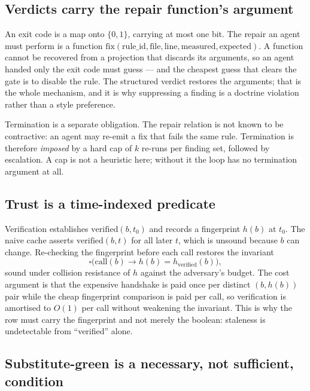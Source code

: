 \documentclass[11pt]{article}
\providecommand{\Box}{\square}
\begin{document}
\subsection{Verdicts carry the repair function's argument}
\label{lbl:HS-GATE-06}

An exit code is a map onto $\{0,1\}$, carrying at most one bit. The repair an
agent must perform is a function $\mathrm{fix}(\mathrm{rule\_id},
\mathrm{file}, \mathrm{line}, \mathrm{measured}, \mathrm{expected})$. A function
cannot be recovered from a projection that discards its arguments, so an agent
handed only the exit code must guess --- and the cheapest guess that clears the
gate is to disable the rule. The structured verdict restores the arguments;
that is the whole mechanism, and it is why suppressing a finding is a doctrine
violation rather than a style preference.

Termination is a separate obligation. The repair relation is not known to be
contractive: an agent may re-emit a fix that fails the same rule. Termination
is therefore \emph{imposed} by a hard cap of $k$ re-runs per finding set,
followed by escalation. A cap is not a heuristic here; without it the loop has
no termination argument at all.

\subsection{Trust is a time-indexed predicate}
\label{lbl:HS-GATE-07}

Verification establishes $\mathrm{verified}(b, t_0)$ and records a fingerprint
$h(b)$ at $t_0$. The naive cache asserts $\mathrm{verified}(b, t)$ for all
later $t$, which is unsound because $b$ can change. Re-checking the fingerprint
before each call restores the invariant
\begin{equation}
\Box\big(\mathrm{call}(b) \rightarrow h(b) = h_{\mathrm{verified}}(b)\big),
\end{equation}
sound under collision resistance of $h$ against the adversary's budget. The
cost argument is that the expensive handshake is paid once per distinct
$(b, h(b))$ pair while the cheap fingerprint comparison is paid per call, so
verification is amortised to $O(1)$ per call without weakening the invariant.
This is why the row must carry the fingerprint and not merely the boolean:
staleness is undetectable from ``verified'' alone.

\subsection{Substitute-green is a necessary, not sufficient, condition}
\label{lbl:HS-GATE-08}
\end{document}
